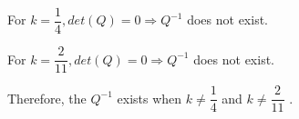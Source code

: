 \documentclass[fleqn]{article}
\begin{document}
\begin{enumerate}
      \textcolor{hwColor}{
        For $k=\dfrac{1}{4}, det(Q)=0 \Longrightarrow Q^{-1}$ does not exist.  
      }

      \textcolor{hwColor}{
        For $k=\dfrac{2}{11}, det(Q)=0 \Longrightarrow Q^{-1}$ does not exist.  
      }

      \textcolor{hwColor}{
        Therefore, the $Q^{-1}$ exists when $k\neq\dfrac{1}{4}$ and $k\neq\dfrac{2}{11}$  .  
      }



  \end{enumerate}
\end{document}
